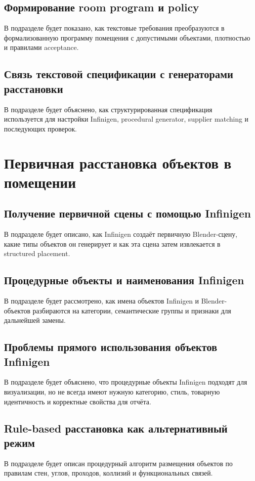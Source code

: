 \documentclass[times]{itmo-student-thesis}
\begin{document}
\subsection{Формирование room program и policy}
В подразделе будет показано, как текстовые требования преобразуются в формализованную программу помещения с допустимыми объектами, плотностью и правилами acceptance.

\subsection{Связь текстовой спецификации с генераторами расстановки}
В подразделе будет объяснено, как структурированная спецификация используется для настройки Infinigen, procedural generator, supplier matching и последующих проверок.

\section{Первичная расстановка объектов в помещении}

\subsection{Получение первичной сцены с помощью Infinigen}
В подразделе будет описано, как Infinigen создаёт первичную Blender-сцену, какие типы объектов он генерирует и как эта сцена затем извлекается в structured placement.

\subsection{Процедурные объекты и наименования Infinigen}
В подразделе будет рассмотрено, как имена объектов Infinigen и Blender-объектов разбираются на категории, семантические группы и признаки для дальнейшей замены.

\subsection{Проблемы прямого использования объектов Infinigen}
В подразделе будет объяснено, что процедурные объекты Infinigen подходят для визуализации, но не всегда имеют нужную категорию, стиль, товарную идентичность и корректные свойства для отчёта.

\subsection{Rule-based расстановка как альтернативный режим}
В подразделе будет описан процедурный алгоритм размещения объектов по правилам стен, углов, проходов, коллизий и функциональных связей.
\end{document}
